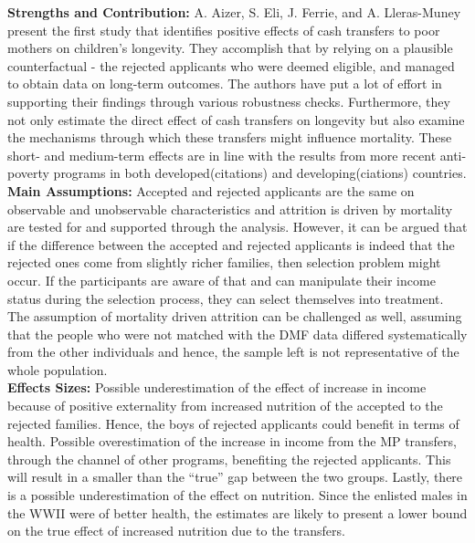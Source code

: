 \textbf{Strengths and Contribution:} A. Aizer, S. Eli, J. Ferrie, and A. Lleras-Muney present the first study that identifies positive effects of cash transfers to poor mothers on children's longevity. They accomplish that by relying on a plausible counterfactual - the rejected applicants who were deemed eligible, and managed to obtain data on long-term outcomes. The authors have put a lot of effort in supporting their findings through various robustness checks. Furthermore, they not only estimate the direct effect of cash transfers on longevity but also examine the mechanisms through which these transfers might influence mortality. These short- and medium-term effects are in line with the results from more recent anti-poverty programs in both developed(citations) and developing(ciations) countries. \\
\textbf{Main Assumptions:} Accepted and rejected applicants are the same on observable and unobservable characteristics and attrition is driven by mortality are tested for and supported through the analysis. However, it can be argued that if the difference between the accepted and rejected applicants is indeed that the rejected ones come from slightly richer families, then selection problem might occur. If the participants are aware of that and can manipulate their income status during the selection process, they can select themselves into treatment. The assumption of mortality driven attrition can be challenged as well, assuming that the people who were not matched with the DMF data differed systematically from the other individuals and hence, the sample left is not representative of the whole population. \\
\textbf{Effects Sizes:} Possible underestimation of the effect of increase in income because of positive
externality from increased nutrition of the accepted to the rejected families. Hence, the boys of rejected applicants could benefit in terms of health. Possible overestimation of the increase in income from the MP transfers, through the channel of other programs, benefiting the rejected applicants. This will result in a smaller than the ``true'' gap between the two groups. Lastly, there is a possible underestimation of the effect on nutrition. Since the enlisted males in the WWII were of better health, the estimates are likely to present a lower bound on the true effect of increased nutrition due to the transfers. \\
